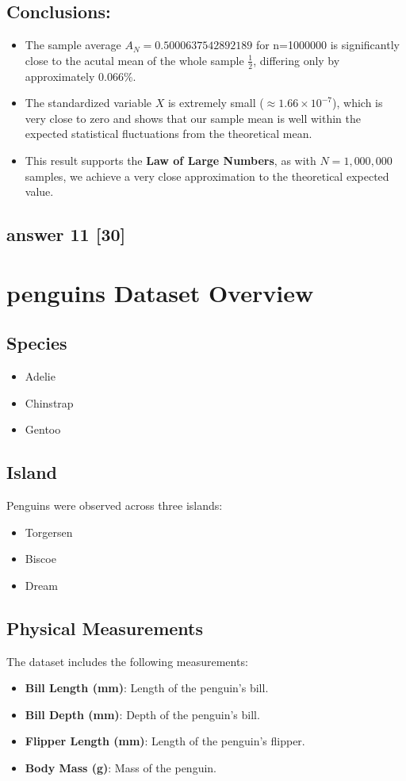 \documentclass[12pt]{article}
\begin{document}
\subsection*{Conclusions:}
\begin{itemize}
    \item The sample average \( A_N = 0.5000637542892189 \) for n=1000000 is significantly close to the acutal mean of the whole sample \( \frac{1}{2} \), differing only by approximately \( 0.066\% \).
    \item The standardized variable \( X \) is extremely small (\( \approx 1.66 \times 10^{-7} \)), which is very close to zero and shows that our sample mean is well within the expected statistical fluctuations from the theoretical mean.
    \item This result supports the \textbf{Law of Large Numbers}, as with \( N = 1,000,000 \) samples, we achieve a very close approximation to the theoretical expected value.
\end{itemize}

\subsection*{answer 11 [30]}
\section*{penguins Dataset Overview}

\subsection*{Species}
\begin{itemize}
    \item Adelie
    \item Chinstrap
    \item Gentoo
\end{itemize}

\subsection*{Island}
Penguins were observed across three islands:
\begin{itemize}
    \item Torgersen
    \item Biscoe
    \item Dream
\end{itemize}

\subsection*{Physical Measurements}
The dataset includes the following measurements:
\begin{itemize}
    \item \textbf{Bill Length (mm)}: Length of the penguin’s bill.
    \item \textbf{Bill Depth (mm)}: Depth of the penguin’s bill.
    \item \textbf{Flipper Length (mm)}: Length of the penguin’s flipper.
    \item \textbf{Body Mass (g)}: Mass of the penguin.
\end{itemize}
\end{document}
